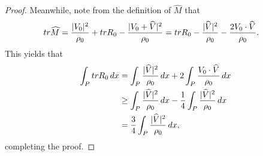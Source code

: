 \documentclass[10pt,a4paper]{amsart}
\newcommand{\tr}{{\rm tr}}
\begin{document}
\begin{proof}
Meanwhile, note from the definition of $\widehat{M}$ that 
  \begin{equation*}
  \begin{split}
  \tr \widehat{M}&=\frac{|V_0|^2}{\rho_0} + \tr R_0-\frac{|V_0+\widehat{V}|^2}{\rho_0}
  = \tr R_0-\frac{|\widehat{V}|^2}{\rho_0}-\frac{2V_0\cdot \widehat{V}}{\rho_0}.
  \end{split}
  \end{equation*}  
  This yields that
  \begin{equation*}
  \begin{split}
  \int_P\tr R_0\,dx&=\int_P\frac{|\widehat{V}|^2}{\rho_0}\,dx+2\int_P\frac{V_0\cdot\widehat{V}}{\rho_0}\,dx
  \\&\geq \int_P\frac{|\widehat{V}|^2}{\rho_0}\,dx-\frac{1}{4}\int_P\frac{|\widehat{V}|^2}{\rho_0}\,dx
  \\&=\frac{3}{4}\int_P\frac{|\widehat{V}|^2}{\rho_0}\,dx,
  \end{split}
  \end{equation*}
completing the proof.   
\end{proof}
\end{document}
